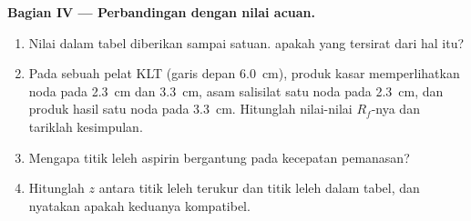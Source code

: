 \begin{problem}
\noindent\textbf{Bagian IV --- Perbandingan dengan nilai acuan.}
\begin{enumerate}[resume]
  \item Nilai dalam tabel diberikan sampai satuan. 
        apakah yang tersirat dari hal itu?
  \item Pada sebuah pelat KLT (garis depan \qty{6.0}{cm}), produk kasar
        memperlihatkan noda pada \qty{2.3}{cm} dan \qty{3.3}{cm}, asam
        salisilat satu noda pada \qty{2.3}{cm}, dan produk hasil
         satu noda pada \qty{3.3}{cm}. Hitunglah nilai-nilai
        $R_f$-nya dan tariklah kesimpulan.
  \item Mengapa titik leleh aspirin bergantung pada kecepatan pemanasan?
  \item Hitunglah  $z$ antara titik leleh terukur
        dan titik leleh dalam tabel, dan nyatakan apakah keduanya
        kompatibel.
\end{enumerate}
\end{problem}
